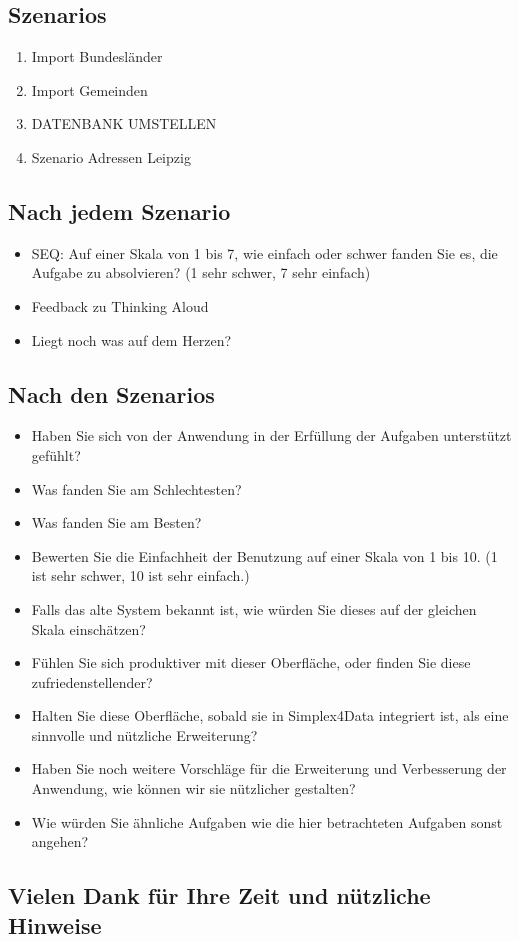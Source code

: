 \subsection*{Szenarios}
\footnotesize{
\begin{enumerate}
  \item Import Bundesländer
  \item Import Gemeinden
  \item[] DATENBANK UMSTELLEN
  \item Szenario Adressen Leipzig
\end{enumerate}
}

\subsection*{Nach jedem Szenario}
\begin{itemize}
  \item SEQ: Auf einer Skala von 1 bis 7, wie einfach oder schwer fanden Sie es, die Aufgabe zu
  absolvieren? (1 sehr schwer, 7 sehr einfach)
  \item Feedback zu Thinking Aloud
  \item Liegt noch was auf dem Herzen?
\end{itemize}

\subsection*{Nach den Szenarios}
\begin{itemize}
  \item Haben Sie sich von der Anwendung in der Erfüllung der Aufgaben unterstützt gefühlt?
  \item Was fanden Sie am Schlechtesten?
  \item Was fanden Sie am Besten?
  \item Bewerten Sie die Einfachheit der Benutzung auf einer Skala von 1 bis 10. (1 ist sehr schwer,
  10 ist sehr einfach.)
  \item Falls das alte System bekannt ist, wie würden Sie dieses auf der gleichen Skala einschätzen?
  \item Fühlen Sie sich produktiver mit dieser Oberfläche, oder finden Sie diese zufriedenstellender?
  \item Halten Sie diese Oberfläche, sobald sie in Simplex4Data integriert ist, als eine sinnvolle
  und nützliche Erweiterung?
  \item Haben Sie noch weitere Vorschläge für die Erweiterung und Verbesserung der Anwendung, wie
  können wir sie nützlicher gestalten?
  \item Wie würden Sie ähnliche Aufgaben wie die hier betrachteten Aufgaben sonst angehen?
\end{itemize}

\subsection*{Vielen Dank für Ihre Zeit und nützliche Hinweise}
